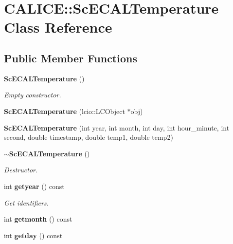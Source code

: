 \section{CALICE::ScECALTemperature Class Reference}
\label{classCALICE_1_1ScECALTemperature}
\subsection*{Public Member Functions}
\begin{DoxyCompactItemize}
\item 
{\bf ScECALTemperature} ()\label{classCALICE_1_1ScECALTemperature_a6a159b028b044032e389f42746d97478}

\begin{DoxyCompactList}\small\item\em Empty constructor. \item\end{DoxyCompactList}\item 
{\bfseries ScECALTemperature} (lcio::LCObject $\ast$obj)\label{classCALICE_1_1ScECALTemperature_a6b1c5e23d94dd95e547fab76e17b110d}

\item 
{\bfseries ScECALTemperature} (int year, int month, int day, int hour\_\-minute, int second, double timestamp, double temp1, double temp2)\label{classCALICE_1_1ScECALTemperature_a2d4ca499fb3c00840d0215bfe655e9b7}

\item 
{\bf $\sim$ScECALTemperature} ()\label{classCALICE_1_1ScECALTemperature_ae4e2ffce5dcc6804ca921dd559eddae6}

\begin{DoxyCompactList}\small\item\em Destructor. \item\end{DoxyCompactList}\item 
int {\bf getyear} () const \label{classCALICE_1_1ScECALTemperature_a9e35dfe2f517cc5faf6b00ed8daa37cc}

\begin{DoxyCompactList}\small\item\em Get identifiers. \item\end{DoxyCompactList}\item 
int {\bfseries getmonth} () const \label{classCALICE_1_1ScECALTemperature_a0e6e6385d86355943eb3d0f966bb3d6a}

\item 
int {\bfseries getday} () const \label{classCALICE_1_1ScECALTemperature_ae131d6ad1ca5ddb4ed1c0e34fb500f85}


\end{DoxyCompactItemize}
